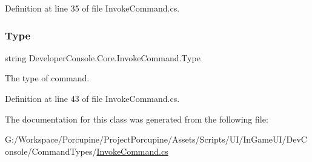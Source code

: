 Definition at line 35 of file Invoke\+Command.\+cs.

\mbox{\label{class_developer_console_1_1_core_1_1_invoke_command_a2b8f38abe9f7892e5a18fcbec6ffb978}} 
\subsubsection{\texorpdfstring{Type}{Type}}
{\footnotesize\ttfamily string Developer\+Console.\+Core.\+Invoke\+Command.\+Type\hspace{0.3cm}{\ttfamily [get]}}



The type of command. 



Definition at line 43 of file Invoke\+Command.\+cs.



The documentation for this class was generated from the following file\+:\begin{DoxyCompactItemize}
\item 
G\+:/\+Workspace/\+Porcupine/\+Project\+Porcupine/\+Assets/\+Scripts/\+U\+I/\+In\+Game\+U\+I/\+Dev\+Console/\+Command\+Types/\hyperlink{_invoke_command_8cs}{Invoke\+Command.\+cs}\end{DoxyCompactItemize}
